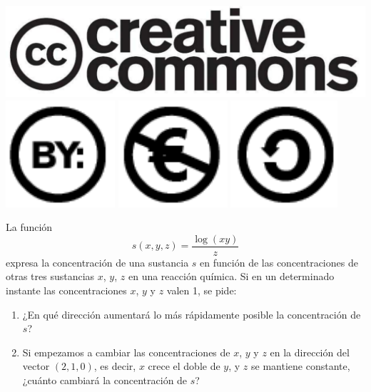 \documentclass[aspectratio=149,10pt,xcolor=dvipsnames,t]{beamer}
\begin{document}
\begin{frame}[c]
\begin{center}
\biskip
\includegraphics[scale=0.07]{img/cc-logo}
\includegraphics[scale=0.2]{img/cc-by}
\includegraphics[scale=0.2]{img/cc-e}
\includegraphics[scale=0.2]{img/cc-c}
\end{center}
\end{frame}

\begin{frame}[c]
\Large
 La función 
\[s(x,y,z)=\dfrac{\log(xy)}{z}\]
expresa la concentración de una sustancia $s$ en función de
las concentraciones de otras tres sustancias $x$, $y$, $z$ en una reacción química. Si en un determinado
instante las concentraciones $x$, $y$ y $z$ valen 1, se pide:
\begin{enumerate}
\item ¿En qué dirección aumentará lo más rápidamente posible la concentración de $s$?
\item Si empezamos a cambiar las concentraciones de $x$, $y$ y $z$ en la dirección del vector
$(2,1,0)$, es decir, $x$ crece el doble de $y$, y $z$ se mantiene constante, ¿cuánto cambiará la concentración de $s$?
\end{enumerate}
\end{frame}
\end{document}
